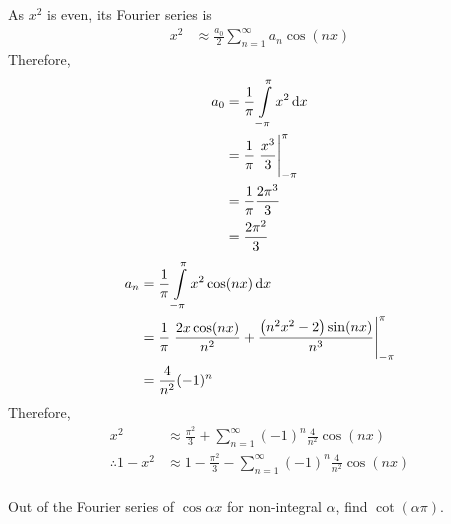 \documentclass[fleqn, a4paper, 11pt, oneside]{amsart}
\theoremstyle{definition}
\theoremstyle{theorem}
\begin{document}
\begin{solution}
	As $x^2$ is even, its Fourier series is
	\begin{align*}
		x^2 & \approx \frac{a_0}{2} \sum\limits_{n = 1}^{\infty} a_n \cos(n x)
	\end{align*}
	Therefore,
	\begin{align*}
		a_0 & = \frac{1}{\pi} \int\limits_{-\pi}^{\pi} x^2 \dif x       \\
                    & = \frac{1}{\pi} \left. \frac{x^3}{3} \right|_{-\pi}^{\pi} \\
                    & = \frac{1}{\pi} \frac{2 \pi^3}{3}                         \\
                    & = \frac{2 \pi^2}{3}
	\end{align*}
	\begin{align*}
		a_n & = \frac{1}{\pi} \int\limits_{-\pi}^{\pi} x^2 \cos(n x) \dif x                                                            \\
                    & = \frac{1}{\pi} \left. \frac{2 x \cos(n x)}{n^2} + \frac{\left( n^2 x^2 - 2 \right) \sin(n x)}{n^3} \right|_{-\pi}^{\pi} \\
                    & = \frac{4}{n^2} (-1)^n
	\end{align*}
	Therefore,
	\begin{align*}
		x^2                & \approx \frac{\pi^2}{3} + \sum\limits_{n = 1}^{\infty} (-1)^n \frac{4}{n^2} \cos(n x)     \\
		\therefore 1 - x^2 & \approx 1 - \frac{\pi^2}{3} - \sum\limits_{n = 1}^{\infty} (-1)^n \frac{4}{n^2} \cos(n x) \\
	\end{align*}
\end{solution}

\begin{question}
	Out of the Fourier series of $\cos \alpha x$ for non-integral $\alpha$, find $\cot(\alpha \pi)$.
\end{question}
\end{document}
